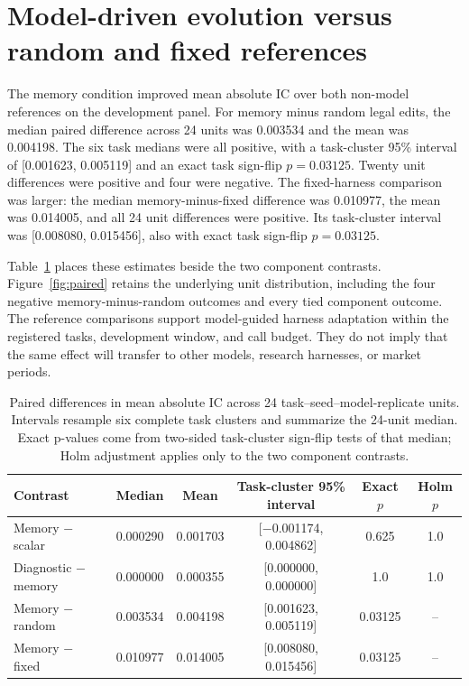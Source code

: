 \section{Model-driven evolution versus random and fixed references}
\label{sec:primary}

The memory condition improved mean absolute IC over both non-model references on the development panel. For memory minus random legal edits, the median paired difference across 24 units was 0.003534 and the mean was 0.004198. The six task medians were all positive, with a task-cluster 95\% interval of [0.001623, 0.005119] and an exact task sign-flip $p=0.03125$. Twenty unit differences were positive and four were negative. The fixed-harness comparison was larger: the median memory-minus-fixed difference was 0.010977, the mean was 0.014005, and all 24 unit differences were positive. Its task-cluster interval was [0.008080, 0.015456], also with exact task sign-flip $p=0.03125$.

Table~\ref{tab:contrasts} places these estimates beside the two component contrasts. Figure~\ref{fig:paired} retains the underlying unit distribution, including the four negative memory-minus-random outcomes and every tied component outcome. The reference comparisons support model-guided harness adaptation within the registered tasks, development window, and call budget. They do not imply that the same effect will transfer to other models, research harnesses, or market periods.

\begin{table}[!htbp]
\caption{Paired differences in mean absolute IC across 24 task--seed--model-replicate units. Intervals resample six complete task clusters and summarize the 24-unit median. Exact p-values come from two-sided task-cluster sign-flip tests of that median; Holm adjustment applies only to the two component contrasts.}
\label{tab:contrasts}
\centering
\ProjectCaption
\scriptsize
\setlength{\tabcolsep}{3pt}
\begin{tabular}{lccccc}
\toprule
Contrast & Median & Mean & Task-cluster 95\% interval & Exact $p$ & Holm $p$ \\
\midrule
Memory $-$ scalar & 0.000290 & 0.001703 & [$-$0.001174, 0.004862] & 0.625 & 1.0 \\
Diagnostic $-$ memory & 0.000000 & 0.000355 & [0.000000, 0.000000] & 1.0 & 1.0 \\
Memory $-$ random & 0.003534 & 0.004198 & [0.001623, 0.005119] & 0.03125 & -- \\
Memory $-$ fixed & 0.010977 & 0.014005 & [0.008080, 0.015456] & 0.03125 & -- \\
\bottomrule
\end{tabular}
\end{table}

